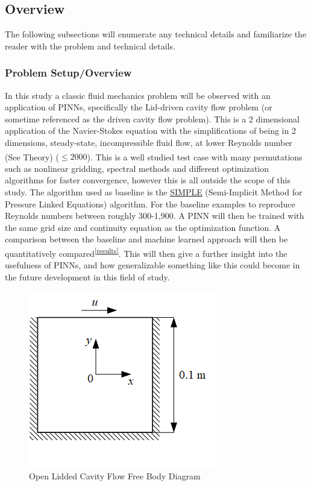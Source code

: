 \documentclass{article}
\begin{document}
\pagebreak

\subsection{Overview}

The following subsections will enumerate any technical details and
familiarize the reader with the problem and technical details.

\subsubsection{Problem Setup/Overview}

In this study a classic fluid mechanics problem will be observed with
an application of PINNs, specifically the Lid-driven cavity flow problem (or
sometime referenced as the driven cavity flow problem). This is a 2 dimensional
application of the Navier-Stokes equation with the simplifications of being in
2 dimensions, steady-state, incompressible fluid flow, at lower Reynolds number
(See Theory\textsuperscript{\pageref{theory}}) ($\le 2000$). This is a well
studied test case with many permutations such as nonlinear gridding, spectral
methods and different optimization algorithms for faster convergence, however
this is all outside the scope of this study. The algorithm used as baseline is
the \href{https://en.wikipedia.org/wiki/SIMPLE_algorithm}{SIMPLE}
(Semi-Implicit Method for Pressure Linked Equations) algorithm. For the
baseline examples to reproduce Reynolds numbers between roughly 300-1,900. A
PINN will then be trained with the same grid size and continuity equation as
the optimization function. A comparison between the baseline and machine
learned approach will then be quantitatively
compared\textsuperscript{\ref{results}}. This will then give a further insight
into the usefulness of PINNs, and how generalizable something like this could
become in the future development in this field of study.

\begin{figure}[ht!]
	\centering
	\includegraphics[scale=1]{./images/ldc.png}
	\caption{Open Lidded Cavity Flow Free Body Diagram
		\cite{NVIDIA}}
	\label{fig:OLC}
\end{figure}
\end{document}

